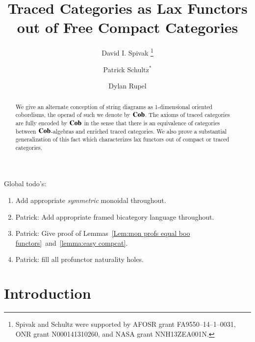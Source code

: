 \documentclass[12pt,oneside,article,draft]{memoir}
\title{Traced Categories as Lax Functors out of Free Compact Categories}
\author{
	David I. Spivak
		\thanks{Spivak and Schultz were supported by AFOSR grant FA9550--14--1--0031, ONR grant N000141310260, and NASA grant NNH13ZEA001N.}
	\and Patrick Schultz${}^*$%
	\and Dylan Rupel 
}
\begin{document}
\tightlists
\firmlists

\maketitle
\begin{abstract}
	We give an alternate conception of string diagrams as 1-dimensional oriented cobordisms, the operad of such we denote by $\mathbf{Cob}$.
	The axioms of traced categories are fully encoded by $\mathbf{Cob}$ in the sense that there is an equivalence of categories between $\mathbf{Cob}$-algebras and enriched traced categories.
	We also prove a substantial generalization of this fact which characterizes lax functors out of compact or traced categories.
\end{abstract}
Global todo's:
\begin{enumerate}
	\item Add appropriate {\em symmetric\/} monoidal throughout.
	\item Patrick: Add appropriate framed bicategory language throughout.
	\item Patrick: Give proof of Lemmas~\ref{Lem:mon profs equal boo functors}~and~\ref{lemma:easy compcat}.
	\item Patrick: fill all profunctor naturality holes.
\end{enumerate}

\setcounter{tocdepth}{1}
\tableofcontents*


\chapter{Introduction}
\end{document}
